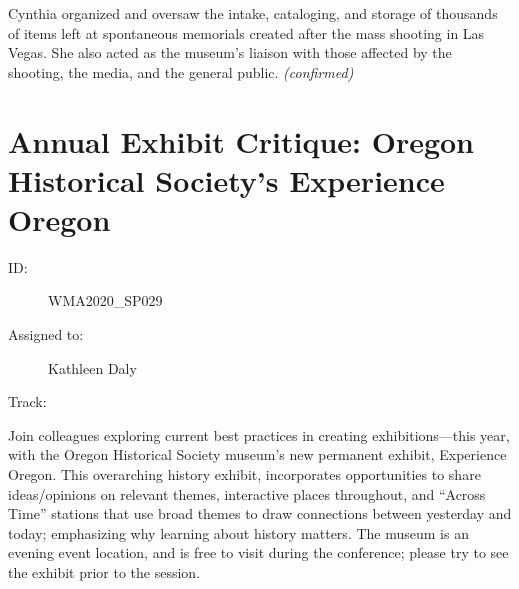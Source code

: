 \documentclass{report}
\begin{document}
                Cynthia organized and oversaw the intake, cataloging, and storage of thousands of items left at spontaneous memorials created after the mass shooting in Las Vegas. She also acted as the museum's liaison with those affected by the shooting, the media, and the general public.
                \emph{ (confirmed) }
              

              
        
          \newpage
          \section{ Annual Exhibit Critique: Oregon Historical Society’s Experience Oregon   }
            \begin{description}
              \item [ID:]
              WMA2020\_SP029

              \item [Assigned to:]Kathleen Daly~
                \item [Track:]
              \end{description}

              Join colleagues exploring current best practices in creating exhibitions—this year, with the Oregon Historical Society museum’s new permanent exhibit, Experience Oregon. This overarching history exhibit, incorporates opportunities to share ideas/opinions on relevant themes, interactive places throughout, and “Across Time” stations that use broad themes to draw connections between yesterday and today; emphasizing why learning about history matters. The museum is an evening event location, and is free to visit during the conference; please try to see the exhibit prior to the session.
\end{document}
